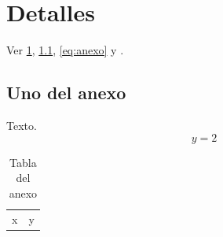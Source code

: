\documentclass[12pt]{report}
\begin{document}
{\sloppy
\printbibliography[heading=bibintoc, title={Referencias del documento}]
}

\appendix
{}
\chapter{Detalles}\label{anx:detalles}
Ver \cref{anx:detalles}, \cref{anxsec:uno}, \cref{eq:anexo} y .
\section{Uno del anexo}\label{anxsec:uno}
Texto.
\begin{equation}y=2\label{eq:anexo}\end{equation}
\begin{table}[h]
\caption{Tabla del anexo}\label{tab:anexo}
\begin{tabular}{ll}
x & y\\
\end{tabular}
\end{table}
\end{document}
